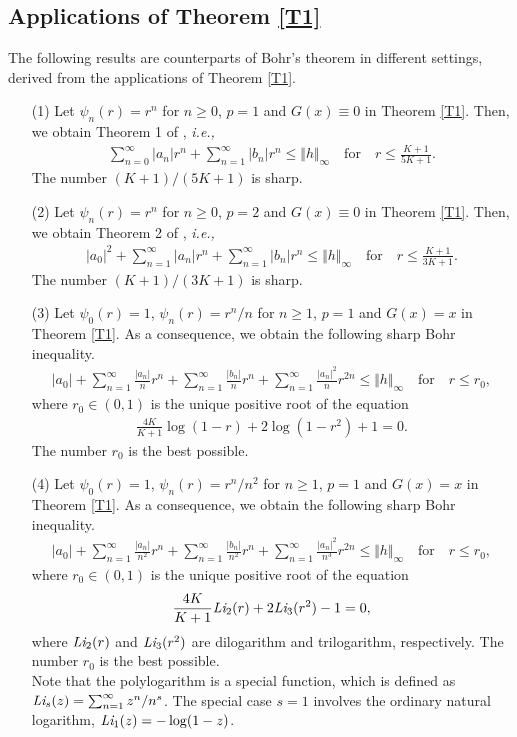 \documentclass[11pt,reqno]{amsart}
\newtheorem{open problem}{Open problem}[section]
\newcommand{\beas}{\begin{eqnarray*}}
\newcommand{\eeas}{\end{eqnarray*}}
\numberwithin{equation}{section}
\begin{document}
\subsection{Applications of \textrm{Theorem \ref{T1}}}
The following results are counterparts of Bohr's theorem in different settings, derived from the applications of \textrm{Theorem \ref{T1}}.
\begin{itemize}
\item[(1)] Let $\psi_n(r)=r^n$ for $n\geq 0$, $p=1$ and $G(x)\equiv 0$ in \textrm{Theorem \ref{T1}}. Then, we obtain \textrm{Theorem 1} of \cite{KPS2018}, {\it i.e.,} 
\beas \sum_{n=0}^\infty |a_n|r^n+\sum_{n=1}^\infty |b_n| r^n\leq \Vert h\Vert_\infty\quad\text{for}\quad r\leq \frac{K+1}{5K+1}.\eeas
The number $(K+1)/(5K+1)$ is sharp.
\item[(2)] Let $\psi_n(r)=r^n$ for $n\geq 0$, $p=2$ and $G(x)\equiv 0$ in \textrm{Theorem \ref{T1}}. Then, we obtain \textrm{Theorem 2} of  \cite{KPS2018}, {\it i.e.,} 
\beas |a_0|^2+\sum_{n=1}^\infty |a_n|r^n+\sum_{n=1}^\infty |b_n| r^n\leq \Vert h\Vert_\infty\quad\text{for}\quad r\leq \frac{K+1}{3K+1}.\eeas
The number $(K+1)/(3K+1)$ is sharp.
\item[(3)] Let $\psi_0(r)=1$, $\psi_n(r)=r^n/n$ for $n\geq 1$, $p=1$ and $G(x)=x$ in \textrm{Theorem \ref{T1}}.  As a consequence, we obtain the following sharp Bohr inequality.
\beas |a_0|+\sum_{n=1}^\infty \frac{|a_n|}{n}r^n+\sum_{n=1}^\infty \frac{|b_n|}{n} r^n+\sum_{n=1}^\infty \frac{|a_n|^2}{n} r^{2n}\leq \Vert h\Vert_\infty\quad\text{for}\quad r\leq r_0,\eeas
where $r_0\in(0,1)$ is the unique positive root of the equation
\beas \frac{4K}{K+1}\log(1-r)+2\log\left(1-r^2\right)+1=0.\eeas
The number $r_0$ is the best possible.
\item[(4)] Let $\psi_0(r)=1$, $\psi_n(r)=r^n/n^2$ for $n\geq 1$, $p=1$ and $G(x)=x$ in \textrm{Theorem \ref{T1}}. As a consequence, we obtain the following sharp Bohr inequality.
\beas |a_0|+\sum_{n=1}^\infty \frac{|a_n|}{n^2}r^n+\sum_{n=1}^\infty \frac{|b_n|}{n^2} r^n+\sum_{n=1}^\infty \frac{|a_n|^2}{n^3} r^{2n}\leq \Vert h\Vert_\infty\quad\text{for}\quad r\leq r_0,\eeas
where $r_0\in(0,1)$ is the unique positive root of the equation
\beas \frac{4K}{K+1}\text{\it Li}_2(r)+2\text{\it Li}_3(r^2)-1=0,\eeas
where $\text{\it Li}_2(r)$ and $\text{\it Li}_3(r^2)$ are dilogarithm and trilogarithm, respectively. The number $r_0$ is the best possible.\\[1mm]
Note that the polylogarithm is a special function, which is defined as $\text{\it Li}_s(z)=\sum_{n=1}^\infty z^n/n^s$. The special case $s=1$ involves the ordinary natural logarithm, $\text{\it Li}_1(z)=-\log(1-z)$.
\end{itemize}
\end{document}
